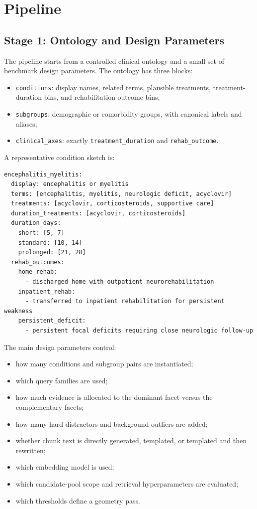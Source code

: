 \documentclass[11pt,a4paper]{article}
\newcommand{\field}[1]{\texttt{#1}}
\newcommand{\stage}[2]{\subsection{\textcolor{betterblue}{#1}: #2}}
\begin{document}
\section{Pipeline}

\stage{Stage 1}{Ontology and Design Parameters}

The pipeline starts from a controlled clinical ontology and a small set of benchmark design parameters. The ontology has three blocks:

\begin{itemize}[noitemsep, topsep=0pt]
	\item \field{conditions}: display names, related terms, plausible treatments, treatment-duration bins, and rehabilitation-outcome bins;
	\item \field{subgroups}: demographic or comorbidity groups, with canonical labels and aliases;
	\item \field{clinical\_axes}: exactly \field{treatment\_duration} and \field{rehab\_outcome}.
\end{itemize}

A representative condition sketch is:

\begin{lstlisting}[style=promptstyle]
encephalitis_myelitis:
  display: encephalitis or myelitis
  terms: [encephalitis, myelitis, neurologic deficit, acyclovir]
  treatments: [acyclovir, corticosteroids, supportive care]
  duration_treatments: [acyclovir, corticosteroids]
  duration_days:
    short: [5, 7]
    standard: [10, 14]
    prolonged: [21, 28]
  rehab_outcomes:
    home_rehab:
      - discharged home with outpatient neurorehabilitation
    inpatient_rehab:
      - transferred to inpatient rehabilitation for persistent weakness
    persistent_deficit:
      - persistent focal deficits requiring close neurologic follow-up
\end{lstlisting}

The main design parameters control:

\begin{itemize}[noitemsep, topsep=0pt]
	\item how many conditions and subgroup pairs are instantiated;
	\item which query families are used;
	\item how much evidence is allocated to the dominant facet versus the complementary facets;
	\item how many hard distractors and background outliers are added;
	\item whether chunk text is directly generated, templated, or templated and then rewritten;
	\item which embedding model is used;
	\item which candidate-pool scope and retrieval hyperparameters are evaluated;
	\item which thresholds define a geometry pass.
\end{itemize}
\end{document}
